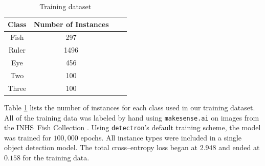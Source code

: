 \documentclass[conference]{IEEEtran}
\begin{document}

\begin{table}[H]
    \centering
      \caption{Training dataset}
    \label{tab:dataset}
    \begin{tabular}{cccc}
        \toprule
        \textbf{Class} & \textbf{Number of Instances}\\
        \midrule
        Fish & 297\\
        Ruler & 1496\\
        Eye & 456\\
        Two & 100\\
        Three & 100\\
      \bottomrule
    \end{tabular}
\end{table}

Table \ref{tab:dataset} lists the number of instances for each class 
used in our training dataset.
All of the training data was labeled by hand using \verb|makesense.ai| \cite{make-sense}
on images from the INHS\ Fish Collection \cite{INHS}.
Using \verb|detectron|'s default training scheme, the model was trained for \(100,000\) epochs. All instance types were included in a single object detection model. The total cross--entropy loss began at \(2.948\) and ended at \(0.158\) for the training data.
\end{document}
